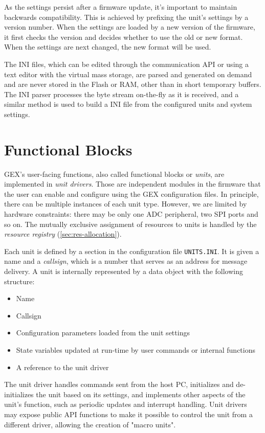 As the settings persist after a firmware update, it's important to maintain backwards compatibility. This is achieved by prefixing the unit's settings by a version number. When the settings are loaded by a new version of the firmware, it first checks the version and decides whether to use the old or new format. When the settings are next changed, the new format will be used.

The INI files, which can be edited through the communication API or using a text editor with the virtual mass storage, are parsed and generated on demand and are never stored in the Flash or RAM, other than in short temporary buffers. The INI parser processes the byte stream on-the-fly as it is received, and a similar method is used to build a INI file from the configured units and system settings.

\section{Functional Blocks} \label{sec:units-function}

GEX's user-facing functions, also called functional blocks or \textit{units}, are implemented in \textit{unit drivers}. Those are independent modules in the firmware that the user can enable and configure using the GEX configuration files. In principle, there can be multiple instances of each unit type. However, we are limited by hardware constraints: there may be only one ADC peripheral, two SPI ports and so on. The mutually exclusive assignment of resources to units is handled by the \textit{resource registry} (\ref{sec:res-allocation}).

Each unit is defined by a section in the configuration file \verb|UNITS.INI|. It is given a name and a \textit{callsign}, which is a number that serves as an address for message delivery. A unit is internally represented by a data object with the following structure:

\begin{itemize}
	\item Name
	\item Callsign
	\item Configuration parameters loaded from the unit settings
	\item State variables updated at run-time by user commands or internal functions
	\item A reference to the unit driver
\end{itemize}

The unit driver handles commands sent from the host PC, initializes and de-initializes the unit based on its settings, and implements other aspects of the unit's function, such as periodic updates and interrupt handling. Unit drivers may expose public API functions to make it possible to control the unit from a different driver, allowing the creation of "macro units".

